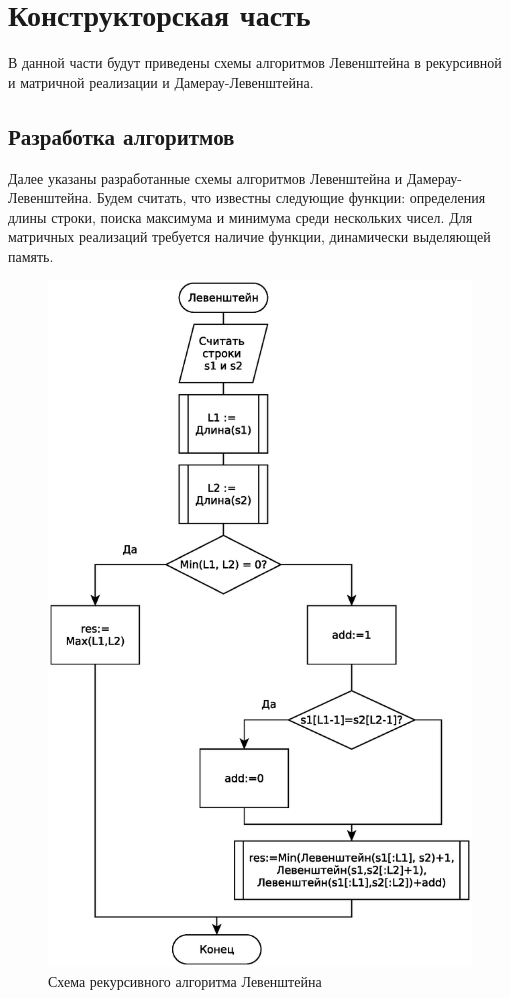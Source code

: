 \chapter{Конструкторская часть}
\label{cha:design}

В данной части будут приведены схемы алгоритмов Левенштейна в рекурсивной и матричной реализации и Дамерау-Левенштейна.

\section{Разработка алгоритмов}

Далее указаны разработанные схемы алгоритмов Левенштейна и Дамерау-Левенштейна.
Будем считать, что известны следующие функции:
определения длины строки,
поиска максимума и минимума среди нескольких чисел.
Для матричных реализаций требуется наличие функции, динамически выделяющей память.


\begin{figure}
    \centering
    \includegraphics[height=0.9\textheight]{schemes/levenshtein-recursive-eps}
    \caption{Схема рекурсивного алгоритма Левенштейна}
    \label{levenshtein-recursive-scheme}
\end{figure}

